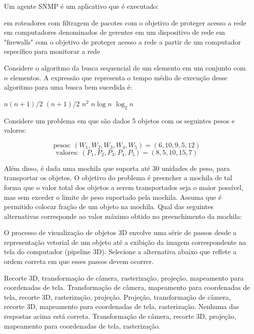 \documentclass[12pt, addpoints]{exam}
\begin{document}
\begin{questions}
\question
Um agente SNMP é um aplicativo que é executado:
\begin{choices}
\choice em roteadores com filtragem de pacotes com o objetivo de proteger acesso a rede
\choice em computadores denominados de gerentes
\choice em um dispositivo de rede
\choice em "firewalls" com o objetivo de proteger acesso a rede
\choice a partir de um computador específico para monitorar a rede
\end{choices}

\question
Considere o algoritmo da busca sequencial de um elemento em um conjunto com \( n \) elementos. A expressão que representa o tempo médio de execução desse algoritmo para uma busca bem sucedida é:
\begin{choices}
\choice \( n(n + 1)/2 \)
\choice \( (n + 1)/2 \)
\choice \( n^2 \)
\choice \( n \log n \)
\choice \( \log_2 n \)
\end{choices}

\question
Considere um problema em que são dados 5 objetos com os seguintes pesos e valores:

\[
\text{pesos: } (W_1, W_2, W_3, W_4, W_5) = (6, 10, 9, 5, 12)
\]
\[
\text{valores: } (P_1, P_2, P_3, P_4, P_5) = (8, 5, 10, 15, 7)
\]

Além disso, é dada uma mochila que suporta até 30 unidades de peso, para transportar os objetos. O objetivo do problema é preencher a mochila de tal forma que o valor total dos objetos a serem transportados seja o maior possível, mas sem exceder o limite de peso suportado pela mochila. Assuma que é permitido colocar fração de um objeto na mochila. Qual das seguintes alternativas corresponde ao valor máximo obtido no preenchimento da mochila:
\begin{choices}
\end{choices}

\question
O processo de visualização de objetos 3D envolve uma série de passos desde a representação vetorial de um objeto até a exibição da imagem correspondente na tela do computador (pipeline 3D). Selecione a alternativa abaixo que reflete a ordem correta em que esses passos devem ocorrer. 
\begin{choices}
\choice Recorte 3D, transformação de câmera, rasterização, projeção, mapeamento para coordenadas de tela. 
\choice Transformação de câmera, mapeamento para coordenadas de tela, recorte 3D, rasterização, projeção. 
\choice Projeção, transformação de câmera, recorte 3D, mapeamento para coordenadas de tela, rasterização. 
\choice Nenhuma das respostas acima está correta.
\choice Transformação de câmera, recorte 3D, projeção, mapeamento para coordenadas de tela, rasterização. 
\end{choices}


\end{questions}
\end{document}
